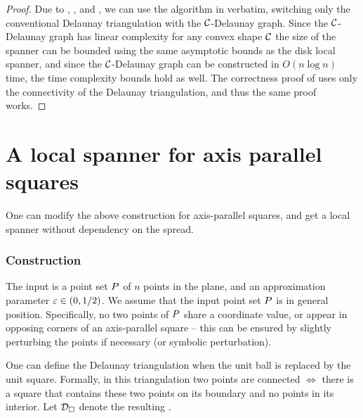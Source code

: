 \documentclass[12pt]{article}%
\begin{document}
\begin{proof}
    Due to ,
    , and , we can use
    the algorithm in  verbatim, switching
    only the conventional Delaunay triangulation with the
    $\mathcal{C}$-Delaunay graph. Since the $\mathcal{C}$-Delaunay graph has linear
    complexity for any convex shape $\mathcal{C}$ the size of the spanner can
    be bounded using the same asymptotic bounds as the disk local
    spanner, and since the $\mathcal{C}$-Delaunay graph can be constructed in
    $O(n\log n)$ time, the time complexity bounds hold as well. The
    correctness proof of  uses only the connectivity of
    the Delaunay triangulation, and thus the same proof works.
\end{proof}






\section{A local spanner for axis parallel squares}
 One can modify the above construction for
axis-parallel squares, and get a local spanner without dependency on
the spread.

\subsubsection{Construction}

The input is a point set $P$ of $n$ points in the plane, and an
approximation parameter $\varepsilon \in (0,1/2)$.  We assume that the input
point set $P$ is in general position. Specifically, no two points of
$P$ share a coordinate value, or appear in opposing corners of an
axis-parallel square -- this can be ensured by slightly perturbing the
points if necessary (or symbolic perturbation).


One can define the Delaunay triangulation when the unit ball is
replaced by the unit square. Formally, in this triangulation two
points are connected $\iff$ there is a square that contains these two
points on its boundary and no points in its interior. Let
$\mathcal{D}_\square$ denote the resulting .
\end{document}
